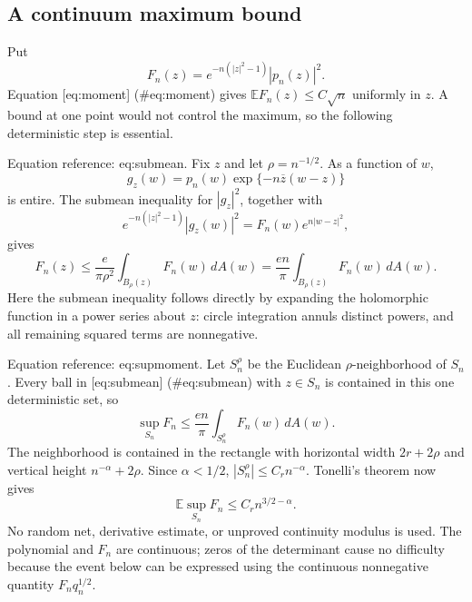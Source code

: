 \documentclass[10pt]{article}
\begin{document}
\subsection*{A continuum maximum bound}
Put \[F_n(z)=e^{-n(|z|^2-1)}|p_n(z)|^2.\] Equation [eq:moment] (\#eq:moment) gives \(\mathbb EF_n(z)\le C\sqrt n\) uniformly in \(z\). A bound at one point would not control the maximum, so the following deterministic step is essential.\par
Equation reference: eq:submean. Fix \(z\) and let \(\rho=n^{-1/2}\). As a function of \(w\), \[g_z(w)=p_n(w)\exp\{-n\overline z(w-z)\}\] is entire. The submean inequality for \(|g_z|^2\), together with \[e^{-n(|z|^2-1)}|g_z(w)|^2
       =F_n(w)e^{n|w-z|^2},\] gives \[
 F_n(z)\le\frac{e}{\pi\rho^2}
                  \int_{B_\rho(z)}F_n(w)\,dA(w)
       =\frac{en}{\pi}\int_{B_\rho(z)}F_n(w)\,dA(w).\] Here the submean inequality follows directly by expanding the holomorphic function in a power series about \(z\): circle integration annuls distinct powers, and all remaining squared terms are nonnegative.\par
Equation reference: eq:supmoment. Let \(S_n^\rho\) be the Euclidean \(\rho\)-neighborhood of \(S_n\). Every ball in [eq:submean] (\#eq:submean) with \(z\in S_n\) is contained in this one deterministic set, so \[\sup_{S_n}F_n\le\frac{en}{\pi}\int_{S_n^\rho}F_n(w)\,dA(w).\] The neighborhood is contained in the rectangle with horizontal width \(2r+2\rho\) and vertical height \(n^{-\alpha}+2\rho\). Since \(\alpha<1/2\), \(|S_n^\rho|\le C_r n^{-\alpha}\). Tonelli’s theorem now gives \[
 \mathbb E\sup_{S_n}F_n\le C_r n^{3/2-\alpha}.\] No random net, derivative estimate, or unproved continuity modulus is used. The polynomial and \(F_n\) are continuous; zeros of the determinant cause no difficulty because the event below can be expressed using the continuous nonnegative quantity \(F_nq_n^{1/2}\).\par
\end{document}
